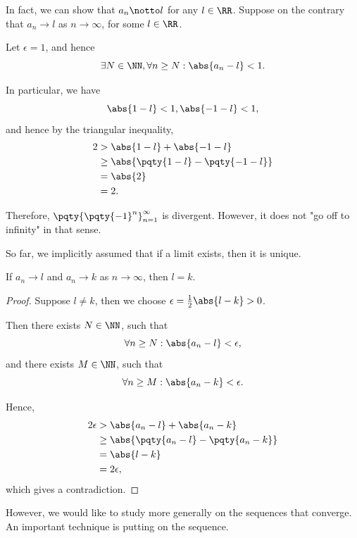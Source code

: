 \begin{examples}
\begin{enumerate}
        In fact, we can show that \(a_n \notto l\) for any \(l \in \RR\). Suppose on the contrary that \(a_n \to l\) as \(n \to \infty\), for some \(l \in \RR\).

        Let \(\epsilon = 1\), and hence
        \[
            \exists N \in \NN, \forall n \geq N: \abs{a_n - l} < 1.
        \]

        In particular, we have
        \[
            \abs{1 - l} < 1, \abs{-1 - l} < 1,
        \]
        and hence by the triangular inequality,
        \begin{align*}
            2 &> \abs{1 - l} + \abs{-1 - l} \\
            &\geq \abs{\pqty{1 - l} - \pqty{-1 - l}} \\
            &= \abs{2} \\
            &= 2.
        \end{align*}

        Therefore, \(\pqty{\pqty{-1}^n}_{n = 1}^{\infty}\) is divergent. However, it does not "go off to infinity" in that sense.
    \end{enumerate}
\end{examples}

So far, we implicitly assumed that if a limit exists, then it is unique.

\begin{proposition}
    If \(a_n \to l\) and \(a_n \to k\) as \(n \to \infty\), then \(l = k\).
\end{proposition}

\begin{proof}
    Suppose \(l \neq k\), then we choose \(\epsilon = \frac{1}{2} \abs{l - k} > 0\).

    Then there exists \(N \in \NN\), such that
    \[
        \forall n \geq N: \abs{a_n - l} < \epsilon,
    \]
    and there exists \(M \in \NN\), such that
    \[
        \forall n \geq M: \abs{a_n - k} < \epsilon.
    \]

    Hence,
    \begin{align*}
        2\epsilon &> \abs{a_n - l} + \abs{a_n - k} \\
        &\geq \abs{\pqty{a_n - l} - \pqty{a_n - k}} \\
        &= \abs{l - k} \\
        &= 2\epsilon,
    \end{align*}
    which gives a contradiction.
\end{proof}

However, we would like to study more generally on the sequences that converge. An important technique is putting  on the sequence.

